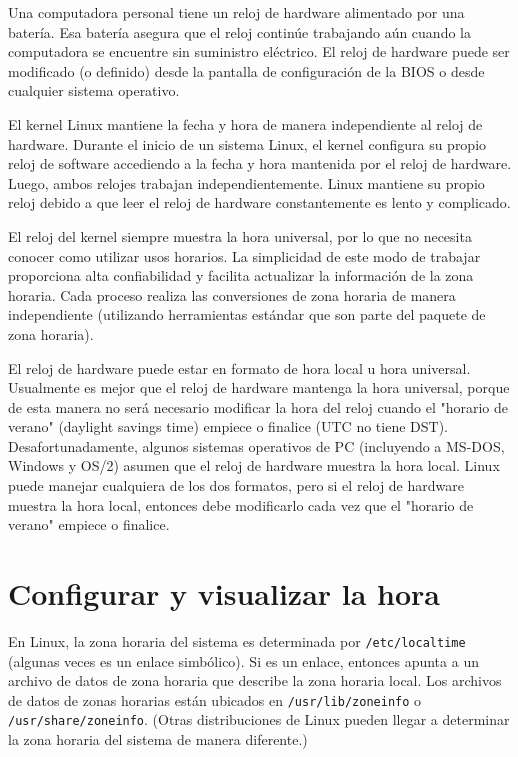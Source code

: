 Una computadora personal tiene un reloj de hardware alimentado por una batería.
Esa batería asegura que el reloj continúe trabajando aún cuando la computadora se encuentre sin
suministro eléctrico. El reloj de hardware puede ser modificado (o definido)
desde la pantalla de configuración de la BIOS o desde cualquier sistema operativo.




El kernel Linux mantiene la fecha y hora de manera independiente al reloj de hardware.
Durante el inicio de un sistema Linux, el kernel configura su propio reloj de software accediendo
a la fecha y hora mantenida por el reloj de hardware.
Luego, ambos relojes trabajan independientemente.
Linux mantiene su propio reloj debido a que leer el reloj de hardware constantemente es lento y complicado.



El reloj del kernel siempre muestra la hora universal, por lo que
no necesita conocer como utilizar usos horarios. La simplicidad de este
modo de trabajar proporciona alta confiabilidad y facilita actualizar 
la información de la zona horaria. Cada proceso realiza las conversiones de zona horaria 
de manera independiente (utilizando herramientas estándar que son parte del paquete de zona horaria).



El reloj de hardware puede estar en formato de hora local u hora universal.
Usualmente es mejor que el reloj de hardware mantenga la hora universal,
porque de esta manera no será necesario modificar la hora del reloj cuando el "horario de verano"
(daylight savings time) empiece o finalice (UTC no tiene DST). Desafortunadamente, algunos sistemas operativos de PC
(incluyendo a MS-DOS, Windows y OS/2) asumen que el reloj de hardware muestra la hora local.
Linux puede manejar cualquiera de los dos formatos, pero si el reloj de hardware muestra la hora local,
entonces debe modificarlo cada vez que el "horario de verano" empiece o finalice.





\section{
Configurar y visualizar la hora}


En Linux, la zona horaria del sistema es determinada por \texttt{/etc/localtime} (algunas veces
es un enlace simbólico). Si es un enlace, entonces apunta a un archivo de datos de zona horaria
que describe la zona horaria local. Los archivos de datos de zonas horarias están ubicados en
\texttt{/usr/lib/zoneinfo} o \texttt{/usr/share/zoneinfo}. (Otras distribuciones de Linux pueden llegar
a determinar la zona horaria del sistema de manera diferente.)




